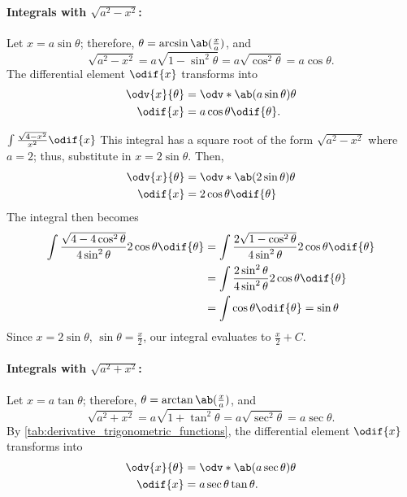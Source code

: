 \paragraph{Integrals with $\sqrt{a^2 - x^2}$:} Let $x = a\sin\theta$; therefore, $\theta = \arcsin\ab(\frac{x}{a})$, and
\begin{equation}
	\sqrt{a^2 - x^2} = a\sqrt{1 - \sin^2\theta} = a\sqrt{\cos^2\theta} = a\cos\theta.
\end{equation}
The differential element $\odif{x}$ transforms into
\begin{align}
	\odv{x}{\theta} &= \odv*{\ab(a\sin\theta)}{\theta} \\
	\odif{x} &= a\cos\theta\odif{\theta}.
\end{align}
\begin{exmp}{$\int\frac{\sqrt{4 - x^2}}{x^2}\odif{x}$}{}
	This integral has a square root of the form $\sqrt{a^2 - x^2}$ where $a = 2$; thus, substitute in $x = 2\sin\theta$. Then,
	\begin{align}
		\odv{x}{\theta} &= \odv*{\ab(2\sin\theta)}{\theta} \\
		\odif{x} &= 2\cos\theta\odif{\theta}
	\end{align}
	The integral then becomes
	\begin{align}
	\int\frac{\sqrt{4 - 4\cos^2\theta}}{4\sin^2\theta}2\cos\theta\odif{\theta} &= \int \frac{2\sqrt{1 - \cos^2\theta}}{4\sin^2\theta}2\cos\theta\odif{\theta} \\
	&= \int\frac{2\sin^2\theta}{4\sin^2\theta}{2\cos\theta}\odif{\theta} \\
	&= \int\cos\theta\odif{\theta} = \sin\theta
	\end{align}
	Since $x = 2\sin\theta$, $\sin\theta = \frac{x}{2}$, our integral evaluates to $\frac{x}{2} + C$.
\end{exmp}

\paragraph{Integrals with $\sqrt{a^2 + x^2}$:} Let $x = a\tan\theta$; therefore, $\theta = \arctan\ab(\frac{x}{a})$, and
\begin{equation}
	\sqrt{a^2 + x^2} = a\sqrt{1 + \tan^2\theta} = a\sqrt{\sec^2\theta} = a\sec\theta.
\end{equation}
By \cref{tab:derivative_trigonometric_functions}, the differential element $\odif{x}$ transforms into
\begin{align}
	\odv{x}{\theta} &= \odv*{\ab(a\sec\theta)}{\theta} \\
	\odif{x} &= a\sec\theta\tan\theta.
\end{align}

